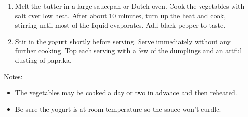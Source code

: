 \begin{recipe}
  \begin{enumerate}

  \item Melt the butter in a large saucepan or Dutch oven.  Cook the
    vegetables with salt over low heat.  After about 10 minutes, turn
    up the heat and cook, stirring until most of the liquid
    evaporates.  Add black pepper to taste.

  \item Stir in the yogurt shortly before serving.  Serve immediately
    without any further cooking.  Top each serving with a few of the
    dumplings and an artful dusting of paprika.
    
  \end{enumerate}

  Notes:
  \begin{itemize}
  \item The vegetables may be cooked a day or two in advance and then
    reheated.

  \item Be sure the yogurt is at room temperature so the sauce won't
    curdle.

  \end{itemize}
\end{recipe}